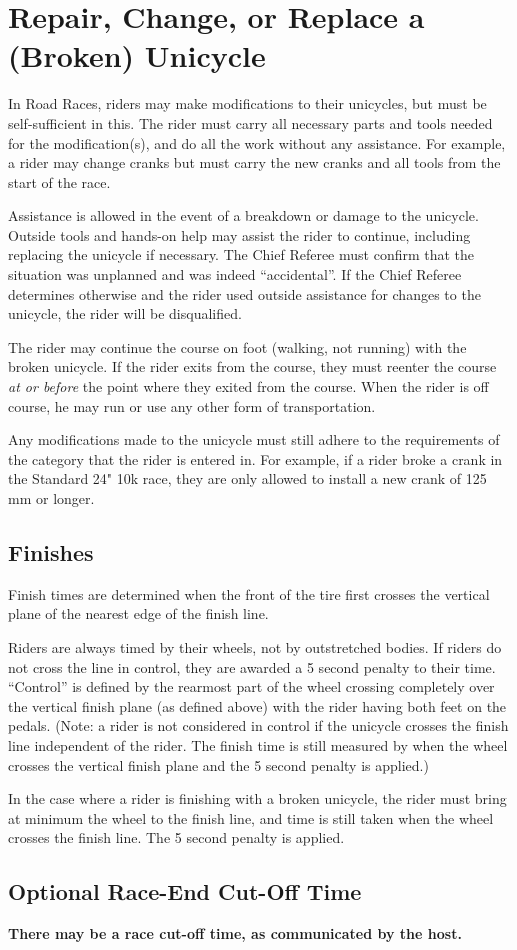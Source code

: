 \section{Repair, Change, or Replace a (Broken) Unicycle}
In Road Races, riders may make modifications to their unicycles, but must be self-sufficient in this.
The rider must carry all necessary parts and tools needed for the modification(s), and do all the work without any assistance.
For example, a rider may change cranks but must carry the new cranks and all tools from the start of the race.

Assistance is allowed in the event of a breakdown or damage to the unicycle.
Outside tools and hands-on help may assist the rider to continue, including replacing the unicycle if necessary.
The Chief Referee must confirm that the situation was unplanned and was indeed ``accidental''.
If the Chief Referee determines otherwise and the rider used outside assistance for changes to the unicycle, the rider will be disqualified.

The rider may continue the course on foot (walking, not running) with the broken unicycle.
If the rider exits from the course, they must reenter the course \emph{at or before} the point where they exited from the course.
When the rider is off course, he may run or use any other form of transportation.

Any modifications made to the unicycle must still adhere to the requirements of the category that the rider is entered in.
For example, if a rider broke a crank in the Standard 24" 10k race, they are only allowed to install a new crank of 125 mm or longer.


\subsection{Finishes}

Finish times are determined when the front of the tire first crosses the vertical plane of the nearest edge of the finish line. 

Riders are always timed by their wheels, not by outstretched bodies.
If riders do not cross the line in control, they are awarded a 5 second penalty to their time.
``Control'' is defined by the rearmost part of the wheel crossing completely over the vertical finish plane (as defined above) with the rider having both feet on the pedals.
(Note: a rider is not considered in control if the unicycle crosses the finish line independent of the rider.
The finish time is still measured by when the wheel crosses the vertical finish plane and the 5 second penalty is applied.)

In the case where a rider is finishing with a broken unicycle, the rider must bring at minimum the wheel to the finish line, and time is still taken when the wheel crosses the finish line.
The 5 second penalty is applied.

\subsection{Optional Race-End Cut-Off Time}

\textbf{There may be a race cut-off time, as communicated by the host.}
